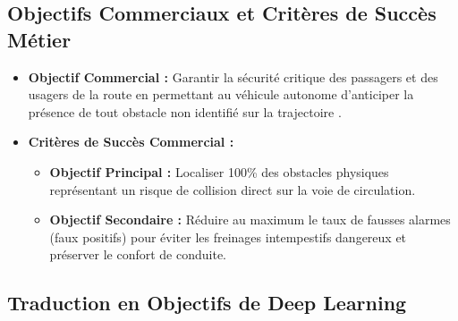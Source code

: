 \documentclass[11pt,a4paper]{article} \usepackage[utf8]{inputenc} \usepackage[T1]{fontenc}
\begin{document}
\subsection{Objectifs Commerciaux et Critères de Succès Métier}

\begin{itemize} \item \textbf{Objectif Commercial :} Garantir la sécurité critique des passagers et des
usagers de la route en permettant au véhicule autonome d'anticiper la présence de tout obstacle non
identifié sur la trajectoire \cite{crispdm2026, cav2023}. \item \textbf{Critères de Succès Commercial :}
\begin{itemize} \item \textbf{Objectif Principal :} Localiser 100\% des obstacles physiques représentant un risque de collision direct sur la voie de circulation. \item \textbf{Objectif Secondaire :} Réduire au maximum le taux de fausses alarmes (faux positifs) pour éviter les freinages intempestifs dangereux et préserver le confort de conduite.
\end{itemize}
\end{itemize}
\subsection{Traduction en Objectifs de Deep Learning}
\end{document}
